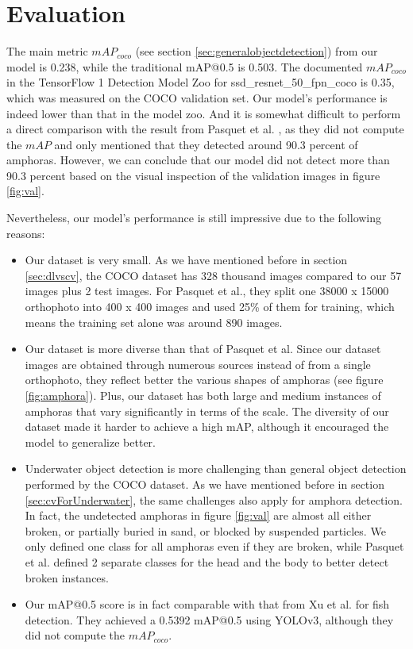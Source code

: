 \documentclass[a4paper, 11pt, oneside]{article}
\begin{document}
  \section{Evaluation}

  The main metric $mAP_{coco}$ (see section \ref{sec:generalobjectdetection}) from our model is 0.238, while the
  traditional mAP@0.5 is 0.503. The documented $mAP_{coco}$ in the TensorFlow 1 Detection Model Zoo for
  ssd\_resnet\_50\_fpn\_coco is 0.35, which was measured on the COCO validation set. Our model's performance is indeed
  lower than that in the model zoo. And it is somewhat difficult to perform a direct comparison with the result from
  Pasquet et al. \cite{pasquet2017amphora}, as they did not compute the $mAP$ and only mentioned that they detected
  around 90.3 percent of amphoras. However, we can conclude that our model did not detect more than 90.3 percent based
  on the visual inspection of the validation images in figure \ref{fig:val}.

  Nevertheless, our model's performance is still impressive due to the following reasons:

  \begin{itemize}
    \item Our dataset is very small. As we have mentioned before in section \ref{sec:dlvscv}, the COCO dataset has 328
    thousand images compared to our 57 images plus 2 test images. For Pasquet et al., they split one 38000 x 15000
    orthophoto into 400 x 400 images and used 25\% of them for training, which means the training set alone was around
    890 images.
    \item Our dataset is more diverse than that of Pasquet et al. Since our dataset images are obtained through
    numerous sources instead of from a single orthophoto, they reflect better the various shapes of amphoras (see
    figure \ref{fig:amphora}). Plus, our dataset has both large and medium instances of amphoras that vary significantly
    in terms of the scale. The diversity of our dataset made it harder to achieve a high mAP, although it encouraged
    the model to generalize better.
    \item Underwater object detection is more challenging than general object detection performed by the COCO dataset.
    As we have mentioned before in section \ref{sec:cvForUnderwater}, the same challenges also apply for amphora
    detection. In fact, the undetected amphoras in figure \ref{fig:val} are almost all either broken, or partially buried
    in sand, or blocked by suspended particles. We only defined one class for all amphoras even if they are broken, while
    Pasquet et al. defined 2 separate classes for the head and the body to better detect broken instances.
    \item Our mAP@0.5 score is in fact comparable with that from Xu et al. \cite{xu2018underwater} for fish detection.
    They achieved a 0.5392 mAP@0.5 using YOLOv3, although they did not compute the $mAP_{coco}$.
  \end{itemize}
\end{document}
